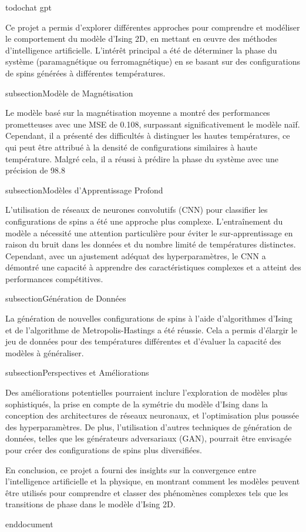 todo{chat gpt}

Ce projet a permis d'explorer différentes approches pour comprendre et modéliser le comportement du modèle d'Ising 2D, en mettant en œuvre des méthodes d'intelligence artificielle. L'intérêt principal a été de déterminer la phase du système (paramagnétique ou ferromagnétique) en se basant sur des configurations de spins générées à différentes températures.

subsection{Modèle de Magnétisation}

Le modèle basé sur la magnétisation moyenne a montré des performances prometteuses avec une MSE de 0.108, surpassant significativement le modèle naïf. Cependant, il a présenté des difficultés à distinguer les hautes températures, ce qui peut être attribué à la densité de configurations similaires à haute température. Malgré cela, il a réussi à prédire la phase du système avec une précision de 98.8%

subsection{Modèles d'Apprentissage Profond}

L'utilisation de réseaux de neurones convolutifs (CNN) pour classifier les configurations de spins a été une approche plus complexe. L'entraînement du modèle a nécessité une attention particulière pour éviter le sur-apprentissage en raison du bruit dans les données et du nombre limité de températures distinctes. Cependant, avec un ajustement adéquat des hyperparamètres, le CNN a démontré une capacité à apprendre des caractéristiques complexes et a atteint des performances compétitives.

subsection{Génération de Données}

La génération de nouvelles configurations de spins à l'aide d'algorithmes d'Ising et de l'algorithme de Metropolis-Hastings a été réussie. Cela a permis d'élargir le jeu de données pour des températures différentes et d'évaluer la capacité des modèles à généraliser.

subsection{Perspectives et Améliorations}

Des améliorations potentielles pourraient inclure l'exploration de modèles plus sophistiqués, la prise en compte de la symétrie du modèle d'Ising dans la conception des architectures de réseaux neuronaux, et l'optimisation plus poussée des hyperparamètres. De plus, l'utilisation d'autres techniques de génération de données, telles que les générateurs adversariaux (GAN), pourrait être envisagée pour créer des configurations de spins plus diversifiées.

En conclusion, ce projet a fourni des insights sur la convergence entre l'intelligence artificielle et la physique, en montrant comment les modèles peuvent être utilisés pour comprendre et classer des phénomènes complexes tels que les transitions de phase dans le modèle d'Ising 2D.


end{document}
